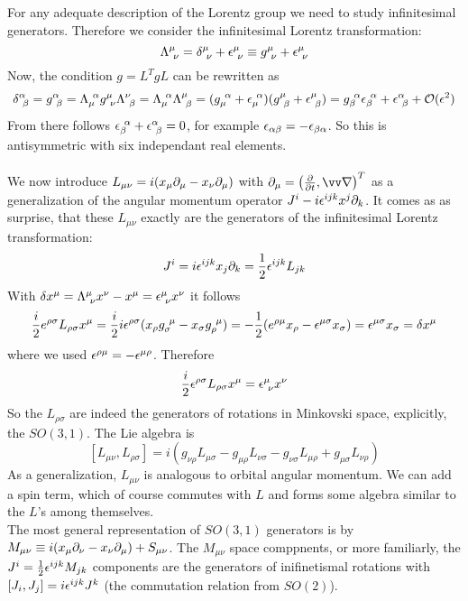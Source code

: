 For any adequate description of the Lorentz group we need to study infinitesimal generators. Therefore we consider the infinitesimal Lorentz transformation:
\[ \Lambda^\mu_{~\nu} = \delta^\mu_{~\nu} + \epsilon^\mu_{~\nu} \equiv g^\mu_{~\nu} + \epsilon^\mu_{~\nu}\]
Now, the condition $g = L^T g L$ can be rewritten as 
\[ \delta^\alpha_{~\beta} = g^\alpha_{~\beta} = \Lambda_\mu^{~\alpha} g^\mu_{~\nu}\Lambda^\nu_{~\beta} = \Lambda_\mu^{~\alpha}\Lambda^\mu_{~\beta} = ( g_\mu^{~\alpha} + \epsilon_\mu^{~\alpha})(g^\mu_{~\beta} + \epsilon^\mu_{~\beta}) = g_\beta^{~\alpha} \epsilon_\beta^{~\alpha} + \epsilon^\alpha_{~\beta} + \mathcal{O}(\epsilon^2)\]
From there follows $\epsilon_\beta^{~\alpha} + \epsilon^\alpha_{~\beta} = 0$, for example $\epsilon_{\alpha\beta} = - \epsilon_{\beta\alpha}$. So this is antisymmetric with six independant real elements.\\
\\
We now introduce $L_{\mu\nu} = i ( x_\mu \partial_\mu - x_\nu\partial_\mu)$ with $\p_\mu = \left( \frac{\p}{\p t}, \vn\right)^T$ as a generalization of the angular momentum operator $J^i -i \epsilon^{ijk} x^j \partial_k$. It comes as as surprise, that these $L_{\mu\nu}$ exactly are the generators of the infinitesimal Lorentz transformation:
\[J^i = i \epsilon^{ijk} x_j \partial _k = \frac{1}{2}\epsilon^{ijk} L_{jk}\]
With $\delta x^\mu = \Lambda^\mu_{~\nu} x^\nu - x^\mu = \epsilon^\mu_{~\nu} x^\nu$ it follows
\[ \frac{i}{2} e^{\rho\sigma} L_{\rho\sigma} x^\mu = \frac{i}{2} i \epsilon^{\rho\sigma} ( x_\rho g_\sigma^{~\mu}- x_\sigma g_\rho^{~\mu}) = - \frac{1}{2} (e^{\rho\mu} x_\rho - \epsilon^{\mu\sigma}x_\sigma )= \epsilon^{\mu\sigma}x_\sigma = \delta x^\mu\]
where we used $\epsilon^{\rho\mu} = - \epsilon^{\mu\rho}$. Therefore
\[ \frac{i}{2}\epsilon^{\rho\sigma} L_{\rho\sigma} x^\mu = \epsilon^\mu_{~\nu} x^\nu\]
So the $L_{\rho\sigma}$ are indeed the generators of rotations in Minkovski space, explicitly, the $SO(3,1)$. The Lie algebra is
\[ [L_{\mu\nu}, L_{\rho\sigma}] = i ( g_{\nu\rho} L_{\mu\sigma} - g_{\mu\rho}L_{\nu\sigma} - g_{\nu\sigma}L_{\mu\rho} + g_{\mu\sigma}L_{\nu\rho})\]
\newline
As a generalization, $L_{\mu\nu}$ is analogous to orbital angular momentum. We can add a spin term, which of course commutes with $L$ and forms some algebra similar to the $L$'s among themselves.\\
The most general representation of $SO(3,1)$ generators is by $M_{\mu\nu} \equiv i(x_\mu \partial_\nu - x_\nu\partial_\mu) + S_{\mu\nu}$. The $M_{\mu\nu}$ space comppnents, or more familiarly, the $J^i = \frac{1}{2} \epsilon^{ijk} M_{jk}$ components are the generators of inifinetismal rotations with $[J_i, J_j] = i \epsilon^{ijk} J^k$ (the commutation relation from $SO(2)$).\\
